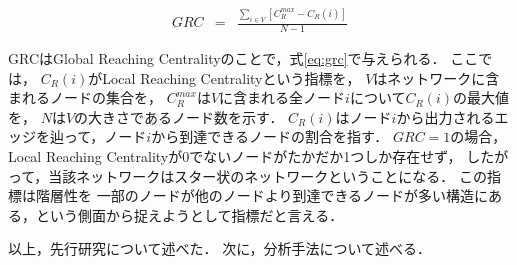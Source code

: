 \begin{eqnarray}
	\label{eq:grc}
	GRC &=& \frac{\sum_{i\in V}[C^{max}_R - C_R(i)]}{N-1}
\end{eqnarray}

GRCはGlobal Reaching Centralityのことで，式\ref{eq:grc}で与えられる．
ここでは，
$C_R(i)$がLocal Reaching Centralityという指標を，
$V$はネットワークに含まれるノードの集合を，
$C_R^{max}$は$V$に含まれる全ノード$i$について$C_R(i)$の最大値を，
$N$は$V$の大きさであるノード数を示す．
$C_R(i)$はノード$i$から出力されるエッジを辿って，ノード$i$から到達できるノードの割合を指す．
$GRC=1$の場合，Local Reaching Centralityが$0$でないノードがたかだか1つしか存在せず，
したがって，当該ネットワークはスター状のネットワークということになる．
この指標は階層性を
一部のノードが他のノードより到達できるノードが多い構造にある，という側面から捉えようとして指標だと言える．







\vvspace
以上，先行研究について述べた．
次に，分析手法について述べる．




